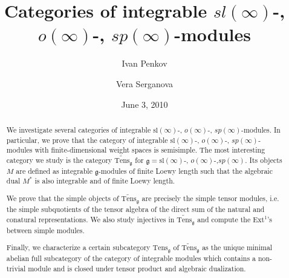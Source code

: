 \documentclass{birkmult}
\renewcommand{\gg}{\mathfrak{g}}
\renewcommand{\sl}{\mathrm{sl}}
\newcommand{\tens}{\mathrm{Tens}}
\newcommand{\lind}{\widetilde{\mathrm{Tens}}}
\begin{document}
\title{Categories of integrable $sl(\infty)$-, $o(\infty)$-, $sp(\infty)$-modules \\}

\author{Ivan Penkov}

\address{Jacobs University Bremen, School of Engineering and Science,
Campus Ring 1, 28759 Bremen, Germany}


\author{Vera Serganova}

\address{Department of Mathematics, University of California
Berkeley, Berkeley CA 94720, USA}




\date{June 3, 2010}

\begin{abstract}
We investigate several categories of integrable $\sl(\infty)$-, $o(\infty)$-, $sp(\infty)$-modules. In particular, we prove that the category of integrable $\sl(\infty)$-, $o(\infty)$-, $sp(\infty)$-modules with finite-dimensional weight spaces is semisimple. The most interesting category we study is the category $\lind_\gg$ for $\gg=\sl(\infty)$-, $o(\infty)$-,\newline $sp(\infty)$. Its objects $M$ are defined as integrable $\gg$-modules of finite Loewy length such that the algebraic dual $M^*$ is also integrable and of finite Loewy length.

We prove that the simple objects of $\lind_\gg$ are precisely the simple tensor modules, i.e. the simple subquotients of the tensor algebra of the direct sum of the natural and conatural representations.
We also study injectives in $\lind_\gg$ and compute the Ext$^1$'s between simple modules. 

Finally, we characterize a certain subcategory $\tens_\gg$ of $\lind_\gg$ as the unique minimal abelian full subcategory of the category of integrable modules which contains a non-trivial module and is closed under tensor product and algebraic dualization.
\end{abstract}

\maketitle
\end{document}
